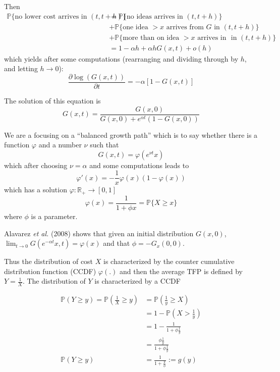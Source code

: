 \documentclass[12pt]{article}
\newcommand{\dpp}[2]{\frac{\partial #1}{\partial #2}}
\begin{document}
Then
\begin{align*}
\mathbb{P} \{ \text{no lower cost arrives in } (t,t+h) \} &=  \mathbb{P} \{ \text{no ideas arrives in } (t,t+h) \} \\
&+ \mathbb{P} \{ \text{one idea } > x \text{ arrives from } G \text{ in }  (t,t+h) \} \\
&+ \mathbb{P} \{ \text{more than on idea } > x \text{ arrives in } \text{ in }  (t,t+h) \} \\
&= 1 - \alpha h + \alpha h G(x,t) + o(h)
\end{align*}
which yields after some computations (rearranging and dividing through by $h$, and letting $ h \rightarrow 0$):
\begin{equation*}
\dpp{\log(G(x,t))}{t}= - \alpha [ 1-G(x,t) ] 
\end{equation*}

The solution of this equation is 
\begin{equation*}
G(x,t) = \frac{G(x,0)}{G(x,0)+ e^{\alpha t}(1-G(x,0))} 
\end{equation*}

We are a focusing on a ``balanced growth path'' which is to say whether there is a function $\varphi$ and a number $\nu$ such that
\begin{equation*}
G(x,t)=\varphi(e^{\nu t} x) 
\end{equation*}
which after choosing $\nu=\alpha$  and some computations leads to
\begin{equation*}
\varphi'(x)=-\frac{1}{x} \varphi(x)(1-\varphi(x))
\end{equation*}
which has a solution $\varphi : \mathbb{R}_+ \rightarrow [0,1]$
\begin{equation*}
\varphi(x)=\frac{1}{1+\phi x}  = \mathbb{P} \{ X \geq x\}
\end{equation*}
where $\phi$ is a parameter.

Alavarez \emph{et al.} (2008) shows that given an initial distribution $G(x,0)$, $\lim_{t\rightarrow 0} G(e^{-\alpha t}x,t) = \varphi (x)$ and that $\phi = -G_x(0,0)$.

Thus the distribution of cost $X$ is characterized by the counter cumulative distribution function (CCDF) $\varphi(.)$ and then the average TFP is defined by $Y=\tfrac{1}{X}$. The distribution of $Y$ is characterized by a CCDF 

\begin{align*}
\mathbb{P} (Y \geq y) = \mathbb{P} (\frac{1}{X}\geq y) &= \mathbb{P} (\frac{1}{y}\geq X) \\
&= 1 - \mathbb{P} ( X >  \frac{1}{y}) \\
&= 1 - \frac{1}{1+ \phi \frac{1}{y}} \\
&= \frac{\phi \frac{1}{y} }{1+ \phi \frac{1}{y}} \\
\mathbb{P} (Y \geq y) &= \frac{1}{1+ \frac{y}{\phi}} := g(y)
\end{align*}
\end{document}
